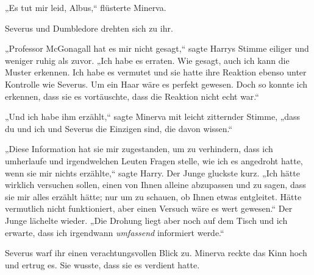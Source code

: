 „Es tut mir leid, Albus,“ flüsterte Minerva.

Severus und Dumbledore drehten sich zu ihr.

„Professor McGonagall hat es mir nicht gesagt,“ sagte Harrys Stimme eiliger und weniger ruhig als zuvor. „Ich habe es erraten. Wie gesagt, auch ich kann die Muster erkennen. Ich habe es vermutet und sie hatte ihre Reaktion ebenso unter Kontrolle wie Severus. Um ein Haar wäre es perfekt gewesen. Doch so konnte ich erkennen, dass sie es vortäuschte, dass die Reaktion nicht echt war.“

„Und ich habe ihm erzählt,“ sagte Minerva mit leicht zitternder Stimme, „dass du und ich und Severus die Einzigen sind, die davon wissen.“

„Diese Information hat sie mir zugestanden, um zu verhindern, dass ich umherlaufe und irgendwelchen Leuten Fragen stelle, wie ich es angedroht hatte, wenn sie mir nichts erzählte,“ sagte Harry. Der Junge gluckste kurz. „Ich hätte wirklich versuchen sollen, einen von Ihnen alleine abzupassen und zu sagen, dass sie mir alles erzählt hätte; nur um zu schauen, ob Ihnen etwas entgleitet. Hätte vermutlich nicht funktioniert, aber einen Versuch wäre es wert gewesen.“ Der Junge lächelte wieder. „Die Drohung liegt aber noch auf dem Tisch und ich erwarte, dass ich irgendwann \emph{umfassend} informiert werde.“

Severus warf ihr einen verachtungsvollen Blick zu. Minerva reckte das Kinn hoch und ertrug es. Sie wusste, dass sie es verdient hatte.


